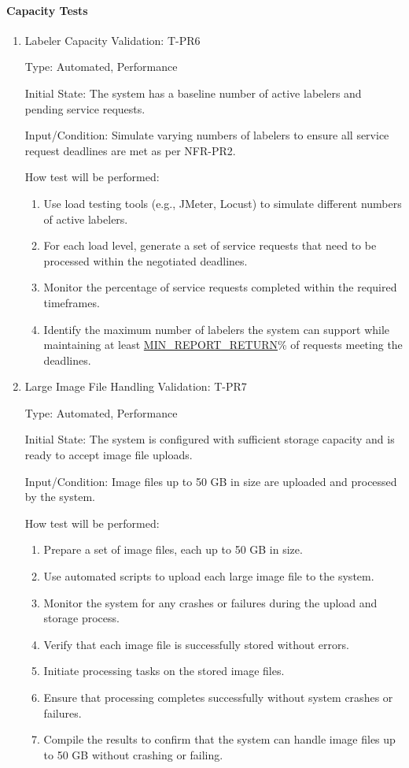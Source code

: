 \documentclass[12pt, titlepage]{article}
\begin{document}
\paragraph{Capacity Tests}
\begin{enumerate}

\item{Labeler Capacity Validation: T-PR6\\}

Type: Automated, Performance

Initial State: The system has a baseline number of active labelers and pending service requests.

Input/Condition: Simulate varying numbers of labelers to ensure all service request deadlines are met as per NFR-PR2.

How test will be performed:
\begin{enumerate}
    \item Use load testing tools (e.g., JMeter, Locust) to simulate different numbers of active labelers.
    \item For each load level, generate a set of service requests that need to be processed within the negotiated deadlines.
    \item Monitor the percentage of service requests completed within the required timeframes.
    \item Identify the maximum number of labelers the system can support while maintaining at least \hyperref[MIN_REPORT_RETURN]{MIN\_REPORT\_RETURN}\% of requests meeting the deadlines.
\end{enumerate}

\item{Large Image File Handling Validation: T-PR7\\}

Type: Automated, Performance

Initial State: The system is configured with sufficient storage capacity and is ready to accept image file uploads.

Input/Condition: Image files up to 50 GB in size are uploaded and processed by the system.

How test will be performed:
\begin{enumerate}
    \item Prepare a set of image files, each up to 50 GB in size.
    \item Use automated scripts to upload each large image file to the system.
    \item Monitor the system for any crashes or failures during the upload and storage process.
    \item Verify that each image file is successfully stored without errors.
    \item Initiate processing tasks on the stored image files.
    \item Ensure that processing completes successfully without system crashes or failures.
    \item Compile the results to confirm that the system can handle image files up to 50 GB without crashing or failing.
\end{enumerate}

\end{enumerate}
\end{document}
